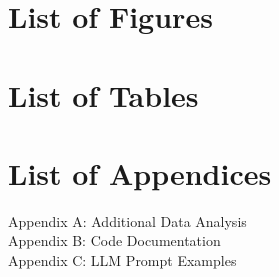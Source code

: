 \newpage

\tableofcontents

\vspace{1em}

\section*{List of Figures}


\listoffigures
\vspace{1em}

\section*{List of Tables}


\listoftables
\vspace{1em}

\section*{List of Appendices}

\noindent Appendix A: Additional Data Analysis \dotfill \pageref{appendix:a}\\
\noindent Appendix B: Code Documentation \dotfill \pageref{appendix:b}\\
\noindent Appendix C: LLM Prompt Examples \dotfill \pageref{appendix:c}
